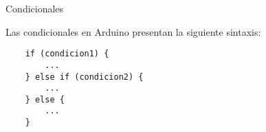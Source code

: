 \begin{frame}[fragile]{Condicionales}\vspace{10pt}

Las condicionales en Arduino presentan la siguiente sintaxis:

\begin{center}
\begin{lstlisting}
	if (condicion1) {
		...	
	} else if (condicion2) {
		...	
	} else {
		...	
	}
\end{lstlisting}
\end{center}

\end{frame}
